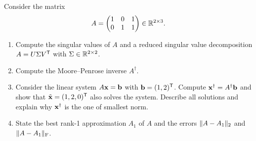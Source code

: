 
\renewcommand{\examletter}{C}

\makeheader

Consider the matrix
\[
A=\begin{pmatrix}1&0&1\\0&1&1\end{pmatrix}\in\mathbb{R}^{2\times 3}.
\]
\begin{enumerate}
\item Compute the singular values of $A$ and a reduced singular value decomposition $A=U\Sigma V^{\mathsf{T}}$ with $\Sigma\in\mathbb{R}^{2\times2}$.
\item Compute the Moore--Penrose inverse $A^\dagger$.
\item Consider the linear system $A\mathbf{x}=\mathbf{b}$ with $\mathbf{b}=(1,2)^{\mathsf{T}}$. Compute $\mathbf{x}^\dagger=A^\dagger\mathbf{b}$ and show that $\tilde{\mathbf{x}}=(1,2,0)^{\mathsf{T}}$ also solves the system. Describe all solutions and explain why $\mathbf{x}^\dagger$ is the one of smallest norm.
\item State the best rank-1 approximation $A_1$ of $A$ and the errors $\lVert A-A_1\rVert_2$ and $\lVert A-A_1\rVert_{\mathrm F}$.
\end{enumerate}


